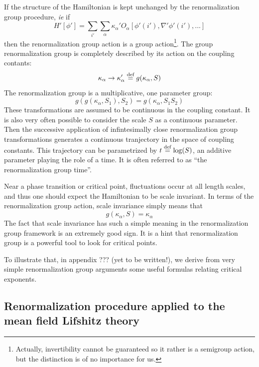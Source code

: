 If the structure of the Hamiltonian is kept unchanged by the renormalization group procedure, \textit{ie} if
\begin{equation}
H'[\phi'] = \sum_{i'} \sum_\alpha \kappa_\alpha' O_\alpha[\phi'(i'), \nabla' \phi'(i'), ...]
\end{equation}
then the renormalization group action is a group action\footnote{Actually, invertibility cannot be guaranteed so it rather is a semigroup action, but the distinction is of no importance for us.}. The group renormalization group is completely described by its action on the coupling contants:
\begin{equation}
\kappa_\alpha \rightarrow \kappa_\alpha'  \overset{\text{def}}{=}  g(\kappa_\alpha, S)
\end{equation}
The renormalization group is a multiplicative, one parameter group:
\begin{equation}
g( g(\kappa_\alpha, S_1), S_2) = g(\kappa_\alpha, S_1 S_2)
\end{equation}
These transformations are assumed to be continuous in the coupling constant. It is also very often possible to consider the scale $S$ as a continuous parameter. Then the successive application of infintesimally close renormalization group transformations generates a continuous tranjectory in the space of coupling constants. This trajectory can be parametrized by $t  \overset{\text{def}}{=}  \log(S)$, an additive parameter playing the role of a time. It is often referred to as ``the renormalization group time''.

Near a phase transition or critical point, fluctuations occur at all length scales, and thus one should expect the Hamiltonian to be scale invariant. 
In terms of the renormalization group action, scale invariance simply means that
\begin{equation}
g(\kappa_\alpha, S) = \kappa_\alpha
\end{equation}
The fact that scale invariance has such a simple meaning in the renormalization group framework is an extremely good sign. It is a hint that renormalization group is a powerful tool to look for critical points.

To illustrate that, in appendix ??? (yet to be written!), we derive from very simple renormalization group arguments some useful formulas relating critical exponents.

\subsection{Renormalization procedure applied to the mean field Lifshitz theory}

